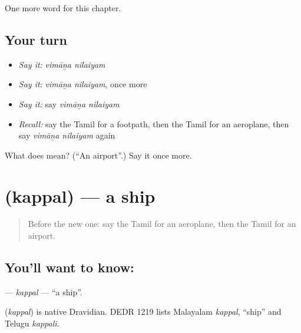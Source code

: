\begin{grammarlens}[title={What you've built}]
One more word for this chapter.
\end{grammarlens}

\subsection*{Your turn}
\begin{itemize}
\raggedright
  \item \emph{Say it:} \emph{vimāṉa nilaiyam}
  \item \emph{Say it:} \emph{vimāṉa nilaiyam}, once more
  \item \emph{Say it:} say \emph{vimāṉa nilaiyam}
  \item \emph{Recall:} say the Tamil for a footpath, then the Tamil for an aeroplane, then say \emph{vimāṉa nilaiyam} again
\end{itemize}

\begin{tcolorbox}[breakable,colback=teal!4,colframe=teal!35!black,title={Before you move on}]
What does   mean? (\textquotedblleft{}An airport\textquotedblright{}.) Say it once more.
\end{tcolorbox}
\section[\texorpdfstring{\ta{கப்பல்} (kappal)}{கப்பல் (kappal)}]{ (kappal) — a ship}

\label{lesson:TA-C263-kappal}



\begin{quote}
Before the new one: say the Tamil for an aeroplane, then the Tamil for an airport.
\end{quote}

\subsection*{You'll want to know: }
\textbf{} — \emph{kappal} — \textquotedblleft{}a ship\textquotedblright{}.

\begin{cousinweb}
\textbf{} (\emph{kappal}) is native Dravidian. DEDR 1219 lists Malayalam \emph{kappal}, \textquotedblleft{}ship\textquotedblright{} and Telugu \emph{kappali}.
\end{cousinweb}

